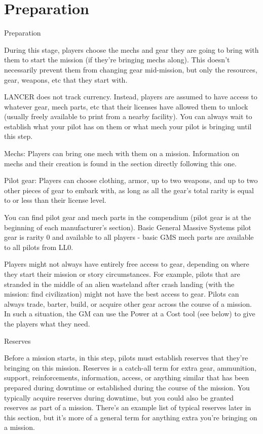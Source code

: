 \chapter{Preparation}
                                                Preparation


During this stage, players choose the mechs and gear they are going to bring with them to start
the mission (if they’re bringing mechs along). This doesn’t necessarily prevent them from
changing gear mid-mission, but only the resources, gear, weapons, etc that they start with.


LANCER does not track currency. Instead, players are assumed to have access to whatever gear,
mech parts, etc that their licenses have allowed them to unlock (usually freely available to print
from a nearby facility). You can always wait to establish what your pilot has on them or what
mech your pilot is bringing until this step.


Mechs: Players can bring one mech with them on a mission. Information on mechs and their
creation is found in the section directly following this one.

Pilot gear: Players can choose clothing, armor, up to two weapons, and up to two other
pieces of gear to embark with, as long as all the gear’s total rarity is equal to or less than their
license level.


You can find pilot gear and mech parts in the compendium (pilot gear is at the beginning of each
manufacturer’s section). Basic General Massive Systems pilot gear is rarity 0 and available to all
players - basic GMS mech parts are available to all pilots from LL0.





Players might not always have entirely free access to gear, depending on where they start their
mission or story circumstances. For example, pilots that are stranded in the middle of an alien
wasteland after crash landing (with the mission: find civilization) might not have the best access
to gear. Pilots can always trade, barter, build, or acquire other gear across the course of a
mission. In such a situation, the GM can use the Power at a Cost tool (see below) to give the
players what they need.


                                                    Reserves


Before a mission starts, in this step, pilots must establish reserves that they’re bringing on this
mission. Reserves is a catch-all term for extra gear, ammunition, support, reinforcements,
information, access, or anything similar that has been prepared during downtime or established
during the course of the mission. You typically acquire reserves during downtime, but you could
also be granted reserves as part of a mission. There’s an example list of typical reserves later in
this section, but it’s more of a general term for anything extra you’re bringing on a mission.
